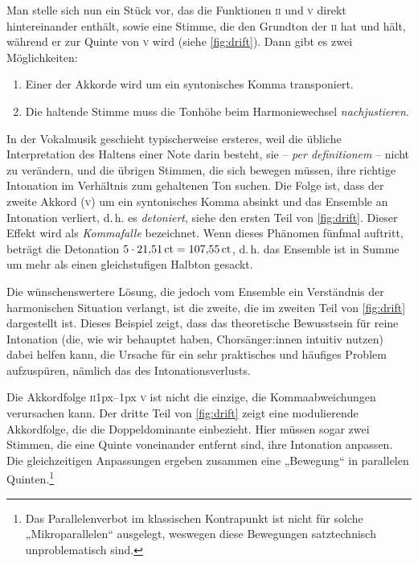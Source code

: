 Man stelle sich nun ein Stück vor, das die Funktionen \textsc{ii} und \textsc{v}
direkt hintereinander enthält, sowie eine Stimme, die den Grundton der \textsc{ii}
hat und hält, während er zur Quinte von \textsc{v} wird (siehe
\cref{fig:drift}). Dann gibt es zwei Möglichkeiten:

\begin{enumerate}[itemsep=0em]
\item Einer der Akkorde wird um ein syntonisches Komma transponiert.
\item Die haltende Stimme muss die Tonhöhe beim Harmoniewechsel 
  \emph{nachjustieren}.
\end{enumerate}%
%
In der Vokalmusik geschieht typischerweise ersteres, weil die übliche
Interpretation des Haltens einer Note darin besteht, sie – \emph{per
  definitionem} – nicht zu verändern, und die übrigen Stimmen, die sich bewegen
müssen, ihre richtige Intonation im Verhältnis zum gehaltenen Ton suchen. Die
Folge ist, dass der zweite Akkord (\textsc{v}) um ein syntonisches Komma absinkt
und das Ensemble an Intonation verliert, d.\,h. es \emph{detoniert}, siehe den
ersten Teil von \cref{fig:drift}. Dieser Effekt wird als \emph{Kommafalle}
bezeichnet. Wenn dieses Phänomen fünfmal auftritt, beträgt die Detonation
$5\cdot 21{,}51\,\mathrm{ct}=107{,}55\,\mathrm{ct}$, d.\,h. das Ensemble ist in Summe um
mehr als einen gleichstufigen Halbton gesackt.

Die wünschenswertere Lösung, die jedoch vom Ensemble ein Verständnis der
harmonischen Situation verlangt, ist die zweite, die im zweiten Teil von
\cref{fig:drift} dargestellt ist. Dieses Beispiel zeigt, dass das theoretische
Bewusstsein für reine Intonation (die, wie wir behauptet haben, Chorsänger:innen
intuitiv nutzen) dabei helfen kann, die Ursache für ein sehr praktisches und
häufiges Problem aufzuspüren, nämlich das des Intonationsverlusts.

Die Akkordfolge \textsc{ii}\kern1px–\kern1px \textsc{v} ist nicht die einzige,
die Kommaabweichungen verursachen kann. Der dritte Teil von \cref{fig:drift}
zeigt eine modulierende Akkordfolge, die die Doppeldominante einbezieht. Hier
müssen sogar zwei Stimmen, die eine Quinte voneinander entfernt sind, ihre
Intonation anpassen. Die gleichzeitigen An\-passungen ergeben zusammen eine
„Bewegung“ in parallelen Quinten.\footnote{Das Parallelenverbot im klassischen
  Kontrapunkt ist nicht für solche „Mikroparallelen“ ausgelegt, weswegen diese
  Bewegungen satztechnisch unproblematisch sind.}

